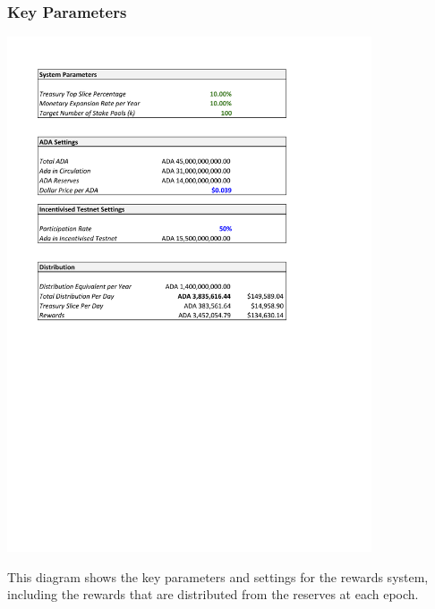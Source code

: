 \documentclass[11pt,a4paper,dvipsnames,twosided,final]{article}
\begin{document}
\subsubsection*{Key Parameters}
\includegraphics[height=6in]{RC1.pdf}

\noindent
This diagram shows the key parameters and settings for the rewards system, including the
rewards that are distributed from the reserves at each epoch.
\end{document}
